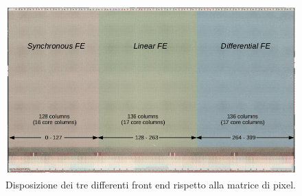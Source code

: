 \begin{figure}
\centering
\includegraphics[scale=.3]{Immagini/FrontEnd}
\caption{Disposizione dei tre differenti front end rispetto alla matrice di pixel.}
\label{FrontEnd}
\end{figure}



